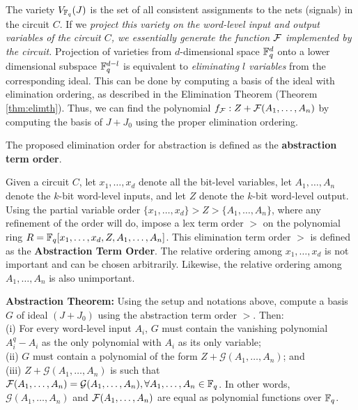 The variety $V_{{\mathbb{F}}_{q}}(J)$ is
the set of all consistent assignments to the nets (signals) in the
circuit $C$. If we {\it project this variety on the word-level input and
output variables of the circuit $C$, we essentially generate the
function ${\mathcal{F}}$ implemented by the circuit.} Projection of varieties from
$d$-dimensional space ${\mathbb{F}}_{q}^d$ onto a lower dimensional subspace
${\mathbb{F}}_{q}^{d-l}$ is equivalent to {\it eliminating $l$ variables} from the
corresponding ideal. This can be done by computing a \Grobner basis
of the ideal with elimination ordering, as described in the 
Elimination Theorem (Theorem \ref{thm:elimth}).
Thus, we can find the polynomial 
$f_{\mathcal{F}}:Z+{\mathcal{F}}(A_1,\dots,A_n)$ by computing the \Grobner
basis of $J+J_0$ using the proper elimination ordering.

The proposed elimination order for 
abstraction is defined as the {\bf abstraction term order}. 

\begin{Definition}
\label{def:ato}
Given a circuit $C$,
let $x_1, \dots, x_d$ denote all the bit-level variables, 
let $A_1,\dots,A_n$ denote the $k$-bit word-level inputs, 
and let $Z$ denote the $k$-bit word-level output. 
Using the partial variable order 
$\{x_1, \dots, x_d\} > Z > \{A_1, \dots, A_n\}$,
where any refinement of the order will do,
impose a lex term order $>$ on the polynomial ring 
$R = {\mathbb{F}}_{q}[x_1, \dots, x_d, Z, A_1, \dots, A_n]$. 
This elimination term order $>$ is defined as
the {\bf Abstraction Term Order}. The relative ordering among $x_1,
\dots, x_d$ is not important and can be chosen arbitrarily. Likewise,
the relative ordering among $A_1, \dots, A_n$ is also unimportant.
\end{Definition}

\begin{Theorem}
{\bf Abstraction Theorem:} Using the setup and notations above,
compute a \Grobner basis $G$ of ideal $(J+J_0)$ using the abstraction term 
order $>$. Then: \\
(i) For every word-level input $A_i$, $G$ must contain the vanishing 
polynomial $A_i^q - A_i$ as the only polynomial with $A_i$ as its only 
variable;\\
(ii) $G$ must contain a polynomial of the form 
$Z + \mathcal{G}(A_1,\dots,A_n)$; and\\ 
(iii) $Z + \mathcal{G}(A_1,\dots,A_n)$ is such that 
${\mathcal{F}}(A_1,\dots,A_n) = {\mathcal{G}}(A_1,\dots,A_n),
\forall A_1,\dots,A_n \in {\mathbb{F}}_{q}$. 
In other words, ${\mathcal{G}}(A_1,\dots,A_n)$ and ${\mathcal{F}}(A_1,\dots,A_n)$ are
equal as polynomial functions over ${\mathbb{F}}_{q}$.
\label{thm:abs}
\end{Theorem}

